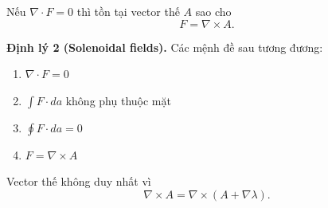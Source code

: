 \begin{enumerate}
Nếu $\nabla \cdot F = 0$ thì tồn tại vector thế $A$ sao cho
\[
F = \nabla \times A.
\]

\textbf{Định lý 2 (Solenoidal fields).} Các mệnh đề sau tương đương:

\begin{enumerate}
\item[(a)] $\nabla \cdot F = 0$
\item[(b)] $\displaystyle \int F \cdot da$ không phụ thuộc mặt
\item[(c)] $\displaystyle \oint F \cdot da = 0$
\item[(d)] $F = \nabla \times A$
\end{enumerate}

Vector thế không duy nhất vì
\[
\nabla \times A = \nabla \times (A + \nabla \lambda).
\]

\end{enumerate}